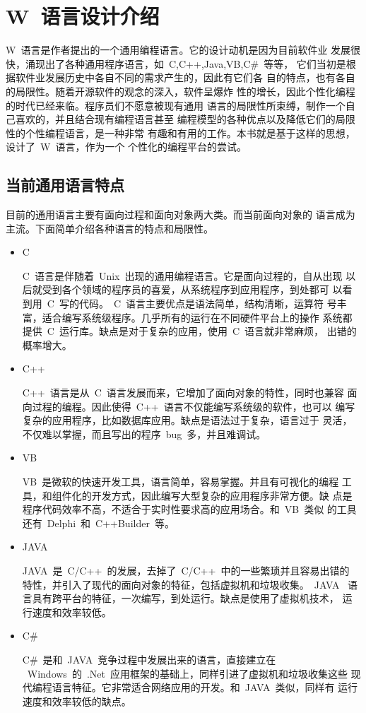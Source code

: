 ﻿%
%

\chapter{W~语言设计介绍}

W~语言是作者提出的一个通用编程语言。它的设计动机是因为目前软件业
发展很快，涌现出了各种通用程序语言，如~C,C++,Java,VB,C\#~等等，
它们当初是根据软件业发展历史中各自不同的需求产生的，因此有它们各
自的特点，也有各自的局限性。随着开源软件的观念的深入，软件呈爆炸
性的增长，因此个性化编程的时代已经来临。程序员们不愿意被现有通用
语言的局限性所束缚，制作一个自己喜欢的，并且结合现有编程语言甚至
编程模型的各种优点以及降低它们的局限性的个性编程语言，是一种非常
有趣和有用的工作。本书就是基于这样的思想，设计了~W~语言，作为一个
个性化的编程平台的尝试。

\section{当前通用语言特点}

目前的通用语言主要有面向过程和面向对象两大类。而当前面向对象的
语言成为主流。下面简单介绍各种语言的特点和局限性。
\begin{itemize}
\item{C}

C~语言是伴随着~Unix~出现的通用编程语言。它是面向过程的，自从出现
以后就受到各个领域的程序员的喜爱，从系统程序到应用程序，到处都可
以看到用~C~写的代码。~C~语言主要优点是语法简单，结构清晰，运算符
号丰富，适合编写系统级程序。几乎所有的运行在不同硬件平台上的操作
系统都提供~C~运行库。缺点是对于复杂的应用，使用~C~语言就非常麻烦，
出错的概率增大。

\item{C++}

C++~语言是从~C~语言发展而来，它增加了面向对象的特性，同时也兼容
面向过程的编程。因此使得~C++~语言不仅能编写系统级的软件，也可以
编写复杂的应用程序，比如数据库应用。缺点是语法过于复杂，语言过于
灵活，不仅难以掌握，而且写出的程序~bug~多，并且难调试。

\item{VB}

VB~是微软的快速开发工具，语言简单，容易掌握。并且有可视化的编程
工具，和组件化的开发方式，因此编写大型复杂的应用程序非常方便。缺
点是程序代码效率不高，不适合于实时性要求高的应用场合。和~VB~类似
的工具还有~Delphi~和~C++Builder~等。

\item{JAVA}

JAVA~是~C/C++~的发展，去掉了~C/C++~中的一些繁琐并且容易出错的
特性，并引入了现代的面向对象的特征，包括虚拟机和垃圾收集。~JAVA~
语言具有跨平台的特征，一次编写，到处运行。缺点是使用了虚拟机技术，
运行速度和效率较低。

\item{C\#}

C\#\cite{cs:2004}~是和~JAVA~竞争过程中发展出来的语言，直接建立在
~Windows~的~.Net~应用框架的基础上，同样引进了虚拟机和垃圾收集这些
现代编程语言特征。它非常适合网络应用的开发。和~JAVA~类似，同样有
运行速度和效率较低的缺点。

\end{itemize}

